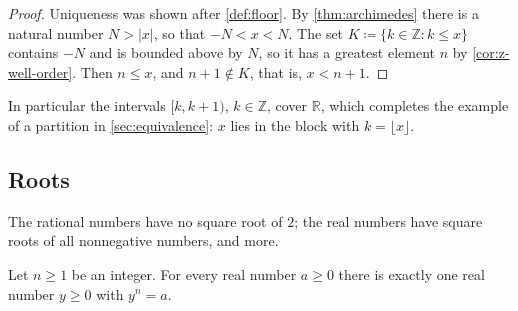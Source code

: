 \begin{proof}
Uniqueness was shown after \cref{def:floor}. By \cref{thm:archimedes} there is a natural number $N>|x|$, so that $-N<x<N$. The set $K\coloneqq\{k\in\mathbb Z: k\le x\}$ contains $-N$ and is bounded above by $N$, so it has a greatest element $n$ by \cref{cor:z-well-order}. Then $n\le x$, and $n+1\notin K$, that is, $x<n+1$.
\end{proof}

In particular the intervals $[k,k+1)$, $k\in\mathbb Z$, cover $\mathbb R$, which completes the example of a partition in \cref{sec:equivalence}: $x$ lies in the block with $k=\lfloor x\rfloor$.

\subsection{Roots}

The rational numbers have no square root of $2$; the real numbers have square roots of all nonnegative numbers, and more.

\begin{theorem}
\label{thm:roots}
Let $n\ge1$ be an integer. For every real number $a\ge0$ there is exactly one real number $y\ge0$ with $y^n=a$.
\end{theorem}

